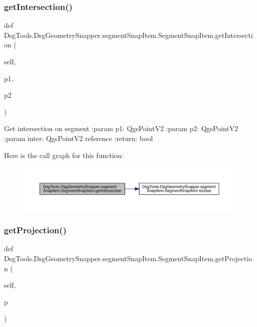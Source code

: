 \subsubsection{\texorpdfstring{get\+Intersection()}{getIntersection()}}
{\footnotesize\ttfamily def Dsg\+Tools.\+Dsg\+Geometry\+Snapper.\+segment\+Snap\+Item.\+Segment\+Snap\+Item.\+get\+Intersection (\begin{DoxyParamCaption}\item[{}]{self,  }\item[{}]{p1,  }\item[{}]{p2 }\end{DoxyParamCaption})}

\begin{DoxyVerb}Get intersection on segment
:param p1: QgsPointV2
:param p2: QgsPointV2
:param inter: QgsPointV2 reference
:return: bool
\end{DoxyVerb}
 Here is the call graph for this function\+:
\nopagebreak
\begin{figure}[H]
\begin{center}
\leavevmode
\includegraphics[width=350pt]{class_dsg_tools_1_1_dsg_geometry_snapper_1_1segment_snap_item_1_1_segment_snap_item_ab51e13ca6ee39f14f6b00f7af423d5b3_cgraph}
\end{center}
\end{figure}
\mbox{\label{class_dsg_tools_1_1_dsg_geometry_snapper_1_1segment_snap_item_1_1_segment_snap_item_aa67a79b6ae9838d3165fab4dc442ed73}} 
\subsubsection{\texorpdfstring{get\+Projection()}{getProjection()}}
{\footnotesize\ttfamily def Dsg\+Tools.\+Dsg\+Geometry\+Snapper.\+segment\+Snap\+Item.\+Segment\+Snap\+Item.\+get\+Projection (\begin{DoxyParamCaption}\item[{}]{self,  }\item[{}]{p }\end{DoxyParamCaption})}

